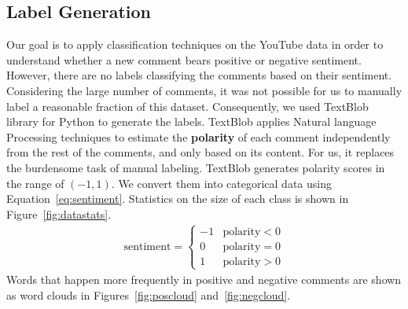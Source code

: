 \subsection{Label Generation}
\label{sec:label}
Our goal is to apply classification techniques on the YouTube data in order to understand whether a new comment bears positive or negative sentiment. However, there are no labels classifying the comments based on their sentiment. Considering the large number of comments, it was not possible for us to manually label a reasonable fraction of this dataset. Consequently, we used TextBlob~\cite{textblob} library for Python to generate the labels. TextBlob applies Natural language Processing techniques to estimate the \textbf{polarity} of each comment independently from the rest of the comments, and only based on its content. For us, it replaces the burdensome task of manual labeling. TextBlob generates polarity scores in the range of $(-1,1)$. We convert them into categorical data using Equation~\ref{eq:sentiment}. Statistics on the size of each class is shown in Figure~\ref{fig:datastats}.
\begin{eqnarray}
\textrm{sentiment}=
\begin{cases}
-1 & \textrm{polarity} < 0\\
0 & \textrm{polarity} = 0\\
1 & \textrm{polarity} > 0
\end{cases}
\label{eq:sentiment}
\end{eqnarray}
Words that happen more frequently in positive and negative comments are shown as word clouds in Figures~\ref{fig:poscloud} and~\ref{fig:negcloud}.

